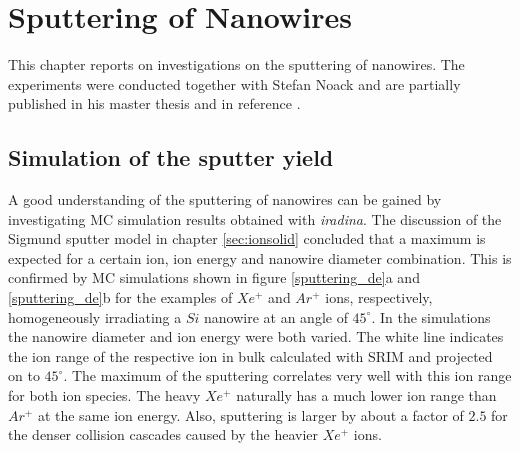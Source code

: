 \chapter{Sputtering of Nanowires}
\label{sec:sputter}

This chapter reports on investigations on the sputtering of nanowires. The experiments were conducted together with Stefan Noack and are partially published in his master thesis \cite{noack_sputter_2014} and in reference \cite{johannes_anomalous_2015}.




\section{Simulation of the sputter yield}
\label{sec:simsputering}

A good understanding of the sputtering of nanowires can be gained by investigating MC simulation results obtained with \emph{iradina}. The discussion of the Sigmund sputter model in chapter \ref{sec:ionsolid} concluded that a maximum is expected for a certain ion, ion energy and nanowire diameter combination. This is confirmed by MC simulations shown in figure \ref{sputtering_de}a and \ref{sputtering_de}b for the examples of $Xe^+$ and $Ar^+$ ions, respectively, homogeneously irradiating a $Si$ nanowire at an angle of $45^\circ$. In the simulations the nanowire diameter and ion energy were both varied. The white line indicates the ion range of the respective ion in bulk calculated with SRIM and projected on to $45^\circ$. The maximum of the sputtering correlates very well with this ion range for both ion species. The heavy $Xe^+$ naturally has a much lower ion range than $Ar^+$ at the same ion energy. Also, sputtering is larger by about a factor of $2.5$ for the denser collision cascades caused by the heavier $Xe^+$ ions.

